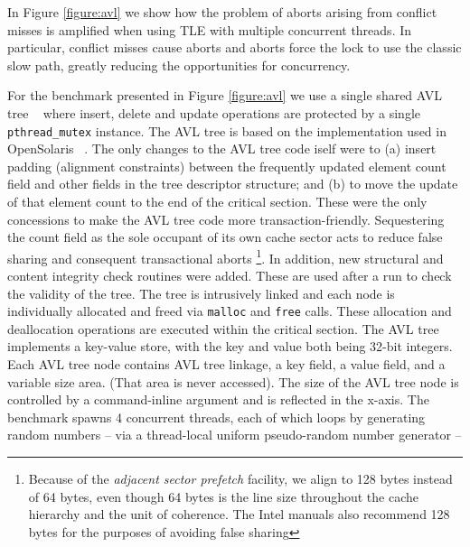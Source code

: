 \documentclass[preprint]{sigplanconf}
\begin{document}


In Figure \ref{figure:avl} we show how the problem of aborts arising from
conflict misses is amplified when using TLE with multiple concurrent threads.  In particular,
conflict misses cause aborts and aborts force the lock to use the classic slow path, 
greatly reducing the opportunities for concurrency.  

For the benchmark presented in
Figure \ref{figure:avl} we use a single shared AVL tree ~\cite{Cormen, AVLTree} where 
insert, delete and update operations are protected by a single 
\texttt{pthread\_mutex} instance.  The AVL tree is based on the implementation
used in OpenSolaris ~\cite{AVLSolaris}.  The only changes to the AVL tree code iself
were to (a) insert padding (alignment constraints) between the frequently updated element 
count field and other fields in the tree descriptor structure; and (b) to move the update
of that element count to the end of the critical section.  These were the only
concessions to make the AVL tree code more transaction-friendly.
Sequestering the count field as the sole occupant of its own cache sector acts to reduce false sharing 
and consequent transactional aborts \footnote{Because of the \emph{adjacent sector prefetch}
facility, we align to 128 bytes instead of 64 bytes, even though 64 bytes is the line
size throughout the cache hierarchy and the unit of coherence.  The Intel manuals also recommend
128 bytes for the purposes of avoiding false sharing}. 
In addition, new structural and content integrity check routines were added. 
These are used after a run to check the validity of the tree. 
The tree is intrusively linked and each node is individually allocated 
and freed via \texttt{malloc} and \texttt{free} calls.  These allocation 
and deallocation operations are executed within the critical section.  
The AVL tree implements a key-value store, with the key and value both 
being 32-bit integers. Each AVL tree node contains AVL tree linkage,
a key field, a value field, and a variable size area.  (That area is never
accessed).  The size of the AVL tree node
is controlled by a command-inline argument and is reflected in the x-axis. 
The benchmark spawns 4 concurrent threads, each of which loops by generating
random numbers -- via a thread-local uniform pseudo-random number generator -- 
\end{document}
